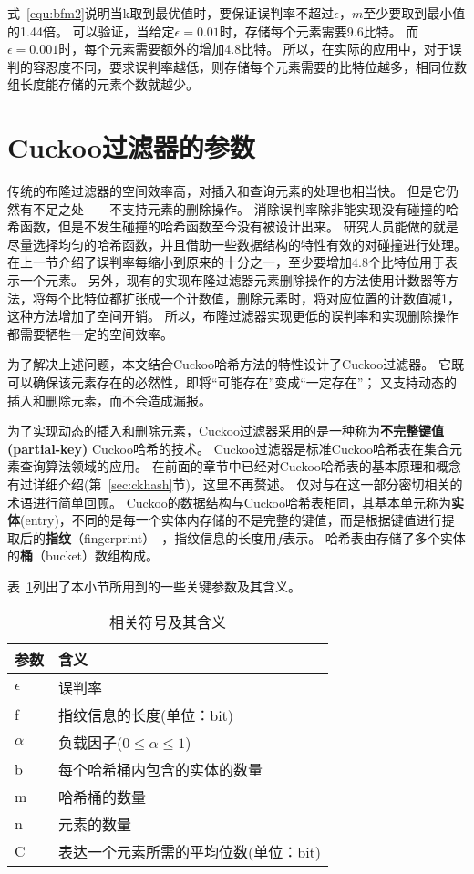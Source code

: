式~\ref{equ:bfm2}说明当k取到最优值时，要保证误判率不超过$\epsilon$，$m$至少要取到最小值的1.44倍。
可以验证，当给定$\epsilon = 0.01$时，存储每个元素需要9.6比特。
而$\epsilon = 0.001 $时，每个元素需要额外的增加4.8比特。
所以，在实际的应用中，对于误判的容忍度不同，要求误判率越低，则存储每个元素需要的比特位越多，相同位数组长度能存储的元素个数就越少。

\section{Cuckoo过滤器的参数}
\label{sec:cbf_para}
传统的布隆过滤器的空间效率高，对插入和查询元素的处理也相当快。
但是它仍然有不足之处——不支持元素的删除操作。
消除误判率除非能实现没有碰撞的哈希函数，但是不发生碰撞的哈希函数至今没有被设计出来。
研究人员能做的就是尽量选择均匀的哈希函数，并且借助一些数据结构的特性有效的对碰撞进行处理。
在上一节介绍了误判率每缩小到原来的十分之一，至少要增加4.8个比特位用于表示一个元素。
另外，现有的实现布隆过滤器元素删除操作的方法使用计数器等方法，将每个比特位都扩张成一个计数值，删除元素时，将对应位置的计数值减1，这种方法增加了空间开销。
所以，布隆过滤器实现更低的误判率和实现删除操作都需要牺牲一定的空间效率。

为了解决上述问题，本文结合Cuckoo哈希方法的特性设计了Cuckoo过滤器。
它既可以确保该元素存在的必然性，即将“可能存在”变成“一定存在”；
又支持动态的插入和删除元素，而不会造成漏报。

为了实现动态的插入和删除元素，Cuckoo过滤器采用的是一种称为\textbf{不完整键值(partial-key)} Cuckoo哈希的技术。
Cuckoo过滤器是标准Cuckoo哈希表在集合元素查询算法领域的应用。
在前面的章节中已经对Cuckoo哈希表的基本原理和概念有过详细介绍(第~\ref{sec:ckhash}节)，这里不再赘述。
仅对与在这一部分密切相关的术语进行简单回顾。
Cuckoo的数据结构与Cuckoo哈希表相同，其基本单元称为\textbf{实体}(entry)，不同的是每一个实体内存储的不是完整的键值，而是根据键值进行提取后的\textbf{指纹}（fingerprint）~\cite{memc3}，指纹信息的长度用$f$表示。
哈希表由存储了多个实体的\textbf{桶}（bucket）数组构成。

表~\ref{tab:ckf_para}列出了本小节所用到的一些关键参数及其含义。
\begin{table}[htbp]
  \centering
  \caption{相关符号及其含义}
  \label{tab:ckf_para}
  \begin{tabular}{ll}
    \toprule
      参数  & 含义  \\
    \midrule
      $\epsilon$  					  &   误判率 \\
        f 							  &   指纹信息的长度(单位：bit)\\
      $\alpha$					      &   负载因子($0\leq\alpha\leq 1$) \\
    	b                             &   每个哈希桶内包含的实体的数量 \\
    	m 							  &	  哈希桶的数量 \\
    	n                             &   元素的数量 \\
        C 							  &   表达一个元素所需的平均位数(单位：bit)\\
    \bottomrule
  \end{tabular}
\end{table}

